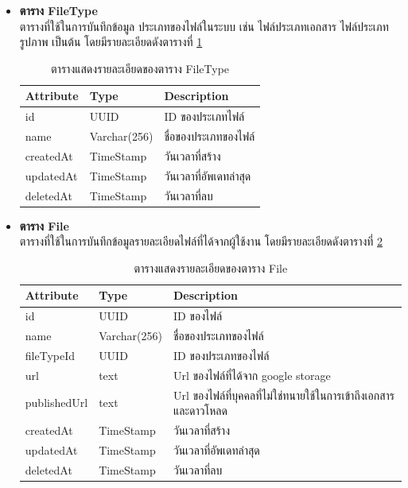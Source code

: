 \documentclass[12pt,oneside,openright,a4paper]{cpe-thai-project}
\begin{document}
\begin{itemize}
\item \textbf{ตาราง FileType}\\
ตารางที่ใช้ในการบันทึกข้อมูล ประเภทของไฟล์ในระบบ เช่น ไฟล์ประเภทเอกสาร ไฟล์ประเภทรูปภาพ เป็นต้น โดยมีรายละเอียดดังตารางที่ \ref{tbl:dbFileType}
\begin{table}[!ht]
    \centering
    \begin{tabular}{|p{4cm}|p{2cm}|p{6cm}|}
    \hline
    \textbf{Attribute} & \textbf{Type} & \textbf{Description}   \\ \hline
    id                 & UUID          & ID ของประเภทไฟล์       \\ \hline
    name               & Varchar(256)   & ชื่อของประเภทของไฟล์   \\ \hline
    createdAt          & TimeStamp     & วันเวลาที่สร้าง        \\ \hline
    updatedAt          & TimeStamp     & วันเวลาที่อัพเดทล่าสุด \\ \hline
    deletedAt          & TimeStamp     & วันเวลาที่ลบ           \\ \hline
    \end{tabular}
    \caption{\centering  ตารางแสดงรายละเอียดของตาราง FileType} \label{tbl:dbFileType}
\end{table}

\newpage
\item \textbf{ตาราง File}\\
ตารางที่ใช้ในการบันทึกข้อมูลรายละเอียดไฟล์ที่ได้จากผู้ใช้งาน โดยมีรายละเอียดดังตารางที่ \ref{tbl:dbFile}
\begin{table}[!ht]
    \centering
    \begin{tabular}{|p{4cm}|p{2cm}|p{6cm}|}
    \hline
    \textbf{Attribute} & \textbf{Type} & \textbf{Description}   \\ \hline
    id                 & UUID          & ID ของไฟล์                                                      \\ \hline
    name               & Varchar(256)   & ชื่อของประเภทของไฟล์                                            \\ \hline
    fileTypeId         & UUID          & ID ของประเภทของไฟล์                                             \\ \hline
    url                & text          & Url ของไฟล์ที่ได้จาก google storage                             \\ \hline
    publishedUrl       & text          & Url ของไฟล์ที่บุคคลที่ไม่ใช่ทนายใช้ในการเข้าถึงเอกสารและดาวโหลด \\ \hline
    createdAt          & TimeStamp     & วันเวลาที่สร้าง                                                 \\ \hline
    updatedAt          & TimeStamp     & วันเวลาที่อัพเดทล่าสุด                                          \\ \hline
    deletedAt          & TimeStamp     & วันเวลาที่ลบ                                                    \\ \hline
    \end{tabular}
    \caption{\centering  ตารางแสดงรายละเอียดของตาราง File} \label{tbl:dbFile}
\end{table}


\end{itemize}
\end{document}
